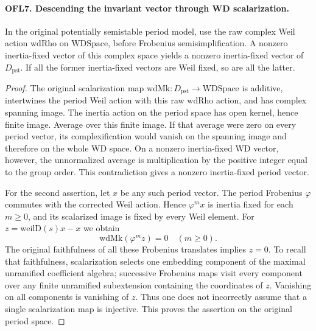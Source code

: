 \documentclass[11pt,a4paper]{article}
\numberwithin{equation}{section}
\theoremstyle{remark}\newtheorem{remark}[theorem]{Remark}
\begin{document}
\paragraph{OFL7. Descending the invariant vector through WD scalarization.}
\label{claim:OFL7}
In the original potentially semistable period model, use the raw
complex Weil action \(\mathrm{wdRho}\) on \(\mathrm{WDSpace}\),
before Frobenius semisimplification.  A nonzero
inertia-fixed vector of this complex space yields a nonzero
inertia-fixed vector of \(D_{\mathrm{pst}}\).  If all the former
inertia-fixed vectors are Weil fixed, so are all the latter.
\begin{proof}
The original scalarization map \(\mathrm{wdMk}:D_{\mathrm{pst}}
\to\mathrm{WDSpace}\) is additive, intertwines the period Weil
action with this raw \(\mathrm{wdRho}\) action,
and has complex spanning image.  The inertia action on the period
space has open kernel, hence finite image.  Average over this finite
image.  If that average were zero on every period vector, its
complexification would vanish on the spanning image and therefore
on the whole WD space.  On a nonzero inertia-fixed WD vector,
however, the unnormalized average is multiplication by the positive
integer equal to the group order.  This contradiction gives a
nonzero inertia-fixed period vector.

For the second assertion, let \(x\) be any such period vector.
The period Frobenius \(\varphi\) commutes with the corrected
Weil action.  Hence \(\varphi^m x\) is inertia fixed for each
\(m\ge0\), and its scalarized image is fixed by every Weil
element.  For \(z=\mathrm{weilD}(s)x-x\) we obtain
\[
             \mathrm{wdMk}(\varphi^m z)=0\quad(m\ge0).
 \tag{OFL.8}
\]
The original faithfulness of all these Frobenius translates implies
\(z=0\).  To recall that faithfulness, scalarization selects one
embedding component of the maximal unramified coefficient algebra;
successive Frobenius maps visit every component over any finite
unramified subextension containing the coordinates of \(z\).
Vanishing on all components is vanishing of \(z\).  Thus one
does not incorrectly assume that a single scalarization map is
injective.  This proves the assertion on the original period space.
\end{proof}

\end{document}
